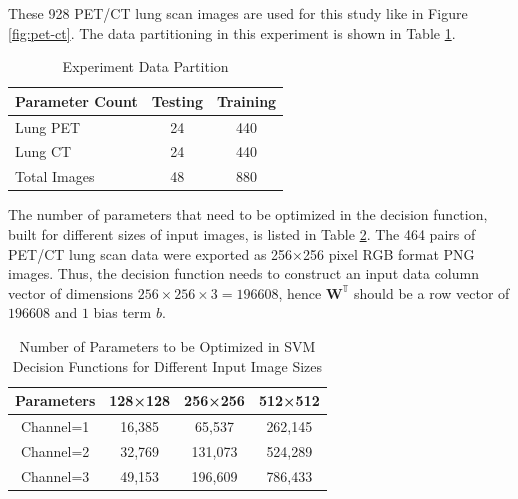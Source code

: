 \documentclass[twocolumn]{article}
\begin{document}
These 928 PET/CT lung scan images are used for this study like in Figure \ref{fig:pet-ct}. The data partitioning in this experiment is shown in Table \ref{tab:dataset_partition_1}.




\begin{table}[h]
	\centering
	\caption{Experiment Data Partition}
	\label{tab:dataset_partition_1}
	\begin{tabularx}{\linewidth}{X c c}
		\toprule
		Parameter Count & Testing & Training \\
		\midrule
		Lung PET        & 24      & 440      \\
		Lung CT         & 24      & 440      \\
		Total Images    & 48      & 880      \\
		\bottomrule
	\end{tabularx}
\end{table}

The number of parameters that need to be optimized in the decision function, built for different sizes of input images, is listed in Table \ref{tab:params_count}. The 464 pairs of PET/CT lung scan data were exported as 256×256 pixel RGB format PNG images. Thus, the decision function needs to construct an input data column vector of dimensions $256 \times 256 \times 3 = 196608$, hence $\mathbf{W}^\mathbb{T}$ should be a row vector of $196608$ and $1$ bias term $b$.

\begin{table}[h]
	\centering
	\caption{Number of Parameters to be Optimized in SVM Decision Functions for Different Input Image Sizes}
	\label{tab:params_count}
	\begin{tabular}{cccc}
		\toprule
		Parameters & 128×128 & 256×256 & 512×512 \\
		\midrule
		Channel=1  & 16,385  & 65,537  & 262,145 \\
		Channel=2  & 32,769  & 131,073 & 524,289 \\
		Channel=3  & 49,153  & 196,609 & 786,433 \\
		\bottomrule
	\end{tabular}
\end{table}
\end{document}

